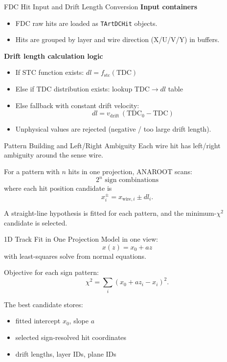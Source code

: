 \documentclass[aspectratio=169]{beamer}
\begin{document}
\begin{frame}{FDC Hit Input and Drift Length Conversion}
\textbf{Input containers}
\begin{itemize}
\item FDC raw hits are loaded as \texttt{TArtDCHit} objects.
\item Hits are grouped by layer and wire direction (X/U/V/Y) in buffers.
\end{itemize}

\textbf{Drift length calculation logic}
\begin{itemize}
\item If STC function exists: \(dl = f_{\mathrm{stc}}(\mathrm{TDC})\)
\item Else if TDC distribution exists: lookup \(\mathrm{TDC} \to dl\) table
\item Else fallback with constant drift velocity:
\[
  dl = v_{\mathrm{drift}}\,(\mathrm{TDC}_0 - \mathrm{TDC})
\]
\item Unphysical values are rejected (negative / too large drift length).
\end{itemize}
\end{frame}

\begin{frame}{Pattern Building and Left/Right Ambiguity}
Each wire hit has left/right ambiguity around the sense wire.

\vspace{0.2cm}
For a pattern with \(n\) hits in one projection, ANAROOT scans:
\[
2^n \text{ sign combinations}
\]
where each hit position candidate is
\[
x_i^{\pm} = x_{\mathrm{wire},i} \pm dl_i.
\]

\vspace{0.2cm}
A straight-line hypothesis is fitted for each pattern, and the minimum-\(\chi^2\) candidate is selected.
\end{frame}

\begin{frame}{1D Track Fit in One Projection}
Model in one view:
\[
x(z) = x_0 + a z
\]
with least-squares solve from normal equations.

\vspace{0.2cm}
Objective for each sign pattern:
\[
\chi^2 = \sum_i \left(x_0 + a z_i - x_i\right)^2.
\]

\vspace{0.2cm}
The best candidate stores:
\begin{itemize}
\item fitted intercept \(x_0\), slope \(a\)
\item selected sign-resolved hit coordinates
\item drift lengths, layer IDs, plane IDs
\end{itemize}
\end{frame}
\end{document}
